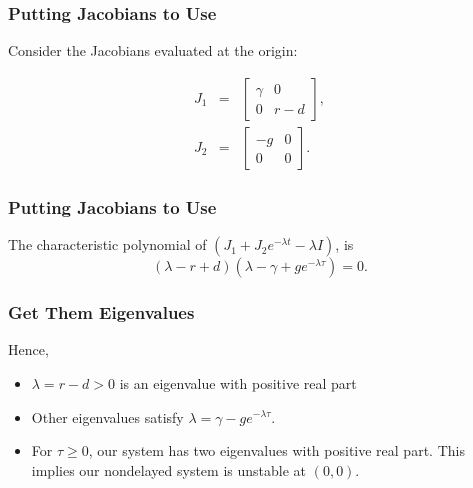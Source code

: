 \begin{frame}\frametitle{Putting Jacobians to Use}
Consider the Jacobians evaluated at the origin:

\begin{eqnarray*}
  J_1 & = & 
            \begin{bmatrix}
              \gamma & 0\\
              0 & r-d
            \end{bmatrix}, \\
  J_2 & = & 
            \begin{bmatrix}
              -g & 0\\
              0 & 0
            \end{bmatrix}.
\end{eqnarray*}

\end{frame}


\begin{frame}[c]\frametitle{Putting Jacobians to Use}

  The characteristic polynomial of
  $(J_1+J_2e^{-\lambda t} -\lambda I)$, is
$$(\lambda - r + d)(\lambda -\gamma + ge^{-\lambda\tau})=0.$$

\end{frame}

\begin{frame}\frametitle{Get Them Eigenvalues}
Hence, 
\begin{itemize}{\itemsep .5in}
\item $\lambda = r-d>0$ is an eigenvalue with positive real part
\item Other eigenvalues satisfy $\lambda=\gamma-ge^{-\lambda\tau}$.
\item For $\tau\geq0$, our system has two eigenvalues with positive
  real part. This implies our nondelayed system is unstable at $(0,0)$.
\end{itemize}
\end{frame}

